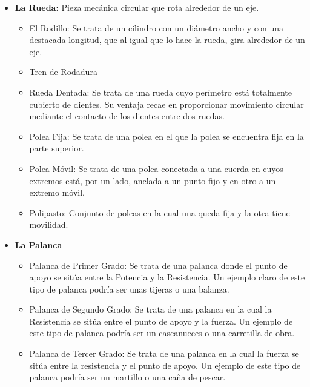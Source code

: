 \documentclass[paper=a4, fontsize=11pt]{scrartcl}
\begin{document}
\begin{itemize}

\item \textbf{La Rueda:} Pieza mecánica circular que rota alrededor de un eje.

\begin{itemize}
\item El Rodillo: Se trata de un cilindro con un diámetro ancho y con una destacada longitud, que al igual que lo hace la rueda, gira alrededor de un eje.

\item Tren de Rodadura
\item Rueda Dentada: Se trata de una rueda cuyo perímetro está totalmente cubierto de dientes. Su ventaja recae en proporcionar movimiento circular mediante el contacto de los dientes entre dos ruedas.

\item Polea Fija: Se trata de una polea en el que la polea se encuentra fija en la parte superior.

\item Polea Móvil: Se trata de una polea conectada a una cuerda en cuyos extremos está, por un lado, anclada a un punto fijo y en otro a un extremo móvil.

\item Polipasto: Conjunto de poleas en la cual una queda fija y la otra tiene movilidad.


\end{itemize}

\item \textbf{La Palanca} 

\begin{itemize}
\item Palanca de Primer Grado: Se trata de una palanca donde el punto de apoyo se sitúa entre la Potencia y la Resistencia. Un ejemplo claro de este tipo de palanca podría ser unas tijeras o una balanza.

\item Palanca de Segundo Grado: Se trata de una palanca en la cual la Resistencia se sitúa entre el punto de apoyo y la fuerza. Un ejemplo de este tipo de palanca podría ser un cascanueces o una carretilla de obra.

\item Palanca de Tercer Grado: Se trata de una palanca en la cual la fuerza se sitúa entre la resistencia y el punto de apoyo. Un ejemplo de este tipo de palanca podría ser un martillo o una caña de pescar.


\end{itemize}
\end{itemize}
\end{document}
